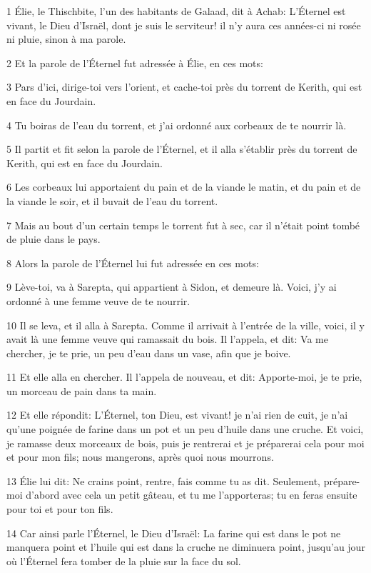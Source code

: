 \par 1 Élie, le Thischbite, l'un des habitants de Galaad, dit à Achab: L'Éternel est vivant, le Dieu d'Israël, dont je suis le serviteur! il n'y aura ces années-ci ni rosée ni pluie, sinon à ma parole.
\par 2 Et la parole de l'Éternel fut adressée à Élie, en ces mots:
\par 3 Pars d'ici, dirige-toi vers l'orient, et cache-toi près du torrent de Kerith, qui est en face du Jourdain.
\par 4 Tu boiras de l'eau du torrent, et j'ai ordonné aux corbeaux de te nourrir là.
\par 5 Il partit et fit selon la parole de l'Éternel, et il alla s'établir près du torrent de Kerith, qui est en face du Jourdain.
\par 6 Les corbeaux lui apportaient du pain et de la viande le matin, et du pain et de la viande le soir, et il buvait de l'eau du torrent.
\par 7 Mais au bout d'un certain temps le torrent fut à sec, car il n'était point tombé de pluie dans le pays.
\par 8 Alors la parole de l'Éternel lui fut adressée en ces mots:
\par 9 Lève-toi, va à Sarepta, qui appartient à Sidon, et demeure là. Voici, j'y ai ordonné à une femme veuve de te nourrir.
\par 10 Il se leva, et il alla à Sarepta. Comme il arrivait à l'entrée de la ville, voici, il y avait là une femme veuve qui ramassait du bois. Il l'appela, et dit: Va me chercher, je te prie, un peu d'eau dans un vase, afin que je boive.
\par 11 Et elle alla en chercher. Il l'appela de nouveau, et dit: Apporte-moi, je te prie, un morceau de pain dans ta main.
\par 12 Et elle répondit: L'Éternel, ton Dieu, est vivant! je n'ai rien de cuit, je n'ai qu'une poignée de farine dans un pot et un peu d'huile dans une cruche. Et voici, je ramasse deux morceaux de bois, puis je rentrerai et je préparerai cela pour moi et pour mon fils; nous mangerons, après quoi nous mourrons.
\par 13 Élie lui dit: Ne crains point, rentre, fais comme tu as dit. Seulement, prépare-moi d'abord avec cela un petit gâteau, et tu me l'apporteras; tu en feras ensuite pour toi et pour ton fils.
\par 14 Car ainsi parle l'Éternel, le Dieu d'Israël: La farine qui est dans le pot ne manquera point et l'huile qui est dans la cruche ne diminuera point, jusqu'au jour où l'Éternel fera tomber de la pluie sur la face du sol.
